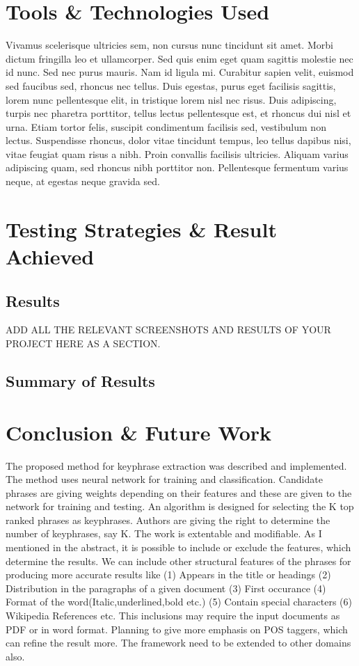 \documentclass[12pt,a4paper,titlepage]{report}
\begin{document}
\chapter{Tools \& Technologies Used}
Vivamus scelerisque ultricies sem, non cursus nunc tincidunt sit amet. Morbi dictum fringilla leo et ullamcorper. Sed quis enim eget quam sagittis molestie nec id nunc. Sed nec purus mauris. Nam id ligula mi. Curabitur sapien velit, euismod sed faucibus sed, rhoncus nec tellus. Duis egestas, purus eget facilisis sagittis, lorem nunc pellentesque elit, in tristique lorem nisl nec risus. Duis adipiscing, turpis nec pharetra porttitor, tellus lectus pellentesque est, et rhoncus dui nisl et urna. Etiam tortor felis, suscipit condimentum facilisis sed, vestibulum non lectus. Suspendisse rhoncus, dolor vitae tincidunt tempus, leo tellus dapibus nisi, vitae feugiat quam risus a nibh. Proin convallis facilisis ultricies. Aliquam varius adipiscing quam, sed rhoncus nibh porttitor non. Pellentesque fermentum varius neque, at egestas neque gravida sed.
\chapter{Testing Strategies \& Result Achieved}
\section{Results}
ADD ALL THE RELEVANT SCREENSHOTS AND RESULTS OF YOUR PROJECT HERE AS A SECTION.
\section{Summary of Results}


\chapter{Conclusion \& Future Work}

The proposed method for keyphrase extraction was described and implemented. The method uses neural network for training and classification. Candidate phrases are giving weights depending on their features and these are given to the network for training and testing. An algorithm is designed for selecting the K top ranked phrases as keyphrases. Authors are giving the right to determine the number of keyphrases, say K. The work is extentable and modifiable. As I mentioned in the abstract, it is possible to include or exclude the features, which determine the results. We can include other structural features of the phrases for producing more accurate results like (1) Appears in the title or headings (2) Distribution in the paragraphs of a given document (3) First occurance (4) Format of the word(Italic,underlined,bold etc.) (5) Contain special characters (6) Wikipedia References etc. This inclusions may require the input documents as PDF or in word format. Planning to give more emphasis on POS taggers, which can refine the result more. The framework need to be extended to other domains also.
\end{document}
